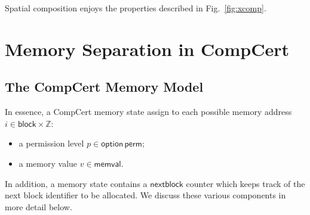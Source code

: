 \documentclass[acmsmall,screen,review,nonacm]{acmart}
\newcommand{\kw}[1]{\ensuremath{ \mathsf{#1} }}
\begin{document}
\begin{theorem}
Spatial composition
enjoys the properties described in Fig.~\ref{fig:xcomp}.
\end{theorem}


\section{Memory Separation in CompCert} \label{app:sep} %




\subsection{The CompCert Memory Model}

In essence,
a CompCert memory state
assign to each possible memory address $i \in \kw{block} \times \mathbb{Z}$:
\begin{itemize}
  \item a permission level $p \in \kw{option}\,\kw{perm}$;
  \item a memory value $v \in \kw{memval}$.
\end{itemize}
In addition,
a memory state contains a $\kw{nextblock}$ counter
which keeps track of the next block identifier to be allocated.
We discuss these various components in more detail below.
\end{document}
